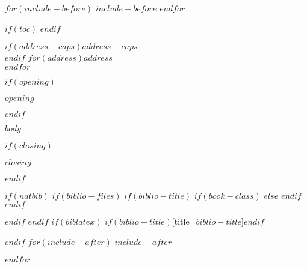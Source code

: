 \documentclass[$if(fontsize)$$fontsize$,$endif$$if(lang)$$lang$,$endif$$if(papersize)$$papersize$,$endif$$for(classoption)$$classoption$$sep$,$endfor$]{letter}
\begin{document}
$for(include-before)$
$include-before$
$endfor$

$if(toc)$
{
\hypersetup{linkcolor=black}
\setcounter{tocdepth}{$toc-depth$}
\tableofcontents
}
$endif$

\begin{letter}{$if(address-caps)${\sc $address-caps$ \\}$endif$
  $for(address)$$address$ \\$endfor$}

$if(opening)$
\opening{$opening$}
$endif$

$body$

$if(closing)$
\longindentation=0pt
\closing{$closing$}
$endif$

\end{letter}

$if(natbib)$
$if(biblio-files)$
$if(biblio-title)$
$if(book-class)$
\renewcommand\bibname{$biblio-title$}
$else$
\renewcommand\refname{$biblio-title$}
$endif$
$endif$


$endif$
$endif$
$if(biblatex)$
\printbibliography$if(biblio-title)$[title=$biblio-title$]$endif$

$endif$
$for(include-after)$
$include-after$

$endfor$
\end{document}
